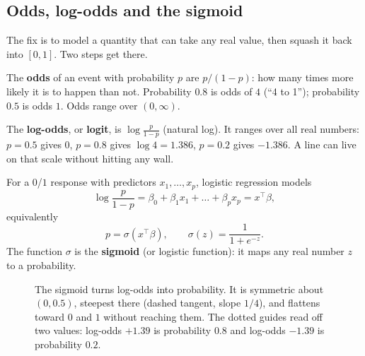 \subsection{Odds, log-odds and the sigmoid}

The fix is to model a quantity that can take any real value, then squash it back into
$[0,1]$. Two steps get there.

The \textbf{odds} of an event with probability $p$ are $p/(1-p)$: how many times more
likely it is to happen than not. Probability $0.8$ is odds of $4$ (``4 to 1''); probability
$0.5$ is odds $1$. Odds range over $(0,\infty)$.

The \textbf{log-odds}, or \textbf{logit}, is $\log\frac{p}{1-p}$ (natural log). It
ranges over all real numbers: $p = 0.5$ gives $0$, $p = 0.8$ gives $\log 4 = 1.386$,
$p = 0.2$ gives $-1.386$. A line can live on that scale without hitting any wall.

\begin{definition}
For a $0$/$1$ response with predictors $x_1,\dots,x_p$, logistic regression models
\[
  \log\frac{p}{1-p} = \beta_0 + \beta_1x_1 + \dots + \beta_p x_p = x^\top\beta,
\]
equivalently
\[
  p = \sigma(x^\top\beta), \qquad \sigma(z) = \frac{1}{1 + e^{-z}} .
\]
The function $\sigma$ is the \textbf{sigmoid} (or logistic function): it maps any real
number $z$ to a probability.
\end{definition}

\begin{figure}[H]
\centering
{}
\caption{The sigmoid turns log-odds into probability. It is symmetric about $(0, 0.5)$,
steepest there (dashed tangent, slope $1/4$), and flattens toward $0$ and $1$ without
reaching them. The dotted guides read off two values: log-odds $+1.39$ is probability
$0.8$ and log-odds $-1.39$ is probability $0.2$.}
\label{fig:logit-sigmoid}
\end{figure}

